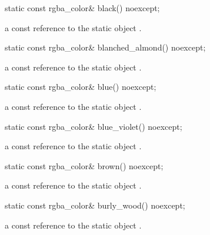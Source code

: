 \begin{itemdecl}
static const rgba_color& black() noexcept;
\end{itemdecl}
\begin{itemdescr}
\pnum
\returns
a const reference to the static  object .
\end{itemdescr}

\begin{itemdecl}
static const rgba_color& blanched_almond() noexcept;
\end{itemdecl}
\begin{itemdescr}
\pnum
\returns
a const reference to the static  object .
\end{itemdescr}

\begin{itemdecl}
static const rgba_color& blue() noexcept;
\end{itemdecl}
\begin{itemdescr}
\pnum
\returns
a const reference to the static  object .
\end{itemdescr}

\begin{itemdecl}
static const rgba_color& blue_violet() noexcept;
\end{itemdecl}
\begin{itemdescr}
\pnum
\returns
a const reference to the static  object .
\end{itemdescr}

\begin{itemdecl}
static const rgba_color& brown() noexcept;
\end{itemdecl}
\begin{itemdescr}
\pnum
\returns
a const reference to the static  object .
\end{itemdescr}

\begin{itemdecl}
static const rgba_color& burly_wood() noexcept;
\end{itemdecl}
\begin{itemdescr}
\pnum
\returns
a const reference to the static  object .
\end{itemdescr}

